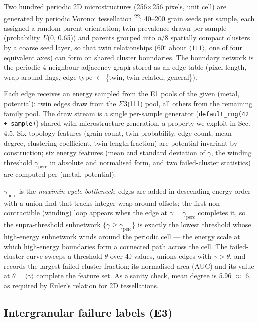 \documentclass[11pt]{article}
\begin{document}
Two hundred periodic 2D microstructures (256$\times$256 pixels, unit cell) are generated by periodic Voronoi tessellation \textsuperscript{22}: 40--200 grain seeds per sample, each assigned a random parent orientation; twin prevalence drawn per sample (probability \textit{U}(0, 0.65)) and parents grouped into \textit{n}/8 spatially compact clusters by a coarse seed layer, so that twin relationships (60$^\circ$ about $\langle 111\rangle$, one of four equivalent axes) can form on shared cluster boundaries. The boundary network is the periodic 4-neighbour adjacency graph stored as an edge table (pixel length, wrap-around flags, edge type $\in$ \{twin, twin-related, general\}).

Each edge receives an energy sampled from the E1 pools of the given (metal, potential): twin edges draw from the $\Sigma$3(111) pool, all others from the remaining family pool. The draw stream is a single per-sample generator (\texttt{default\_rng(42 + sample)}) shared with microstructure generation, a property we exploit in Sec. 4.5. Six topology features (grain count, twin probability, edge count, mean degree, clustering coefficient, twin-length fraction) are potential-invariant by construction; six energy features (mean and standard deviation of $\gamma$, the winding threshold $\gamma_{\mathrm{perc}}$ in absolute and normalised form, and two failed-cluster statistics) are computed per (metal, potential).

$\gamma_{\mathrm{perc}}$ is the \textit{maximin cycle bottleneck}: edges are added in descending energy order with a union-find that tracks integer wrap-around offsets; the first non-contractible (winding) loop appears when the edge at $\gamma = \gamma_{\mathrm{perc}}$ completes it, so the supra-threshold subnetwork $\{\gamma \ge \gamma_{\mathrm{perc}}\}$ is exactly the lowest threshold whose high-energy subnetwork winds around the periodic cell --- the energy scale at which high-energy boundaries form a connected path across the cell. The failed-cluster curve sweeps a threshold $\theta$ over 40 values, unions edges with $\gamma > \theta$, and records the largest failed-cluster fraction; its normalised area (AUC) and its value at $\theta = \langle\gamma\rangle$ complete the feature set. As a sanity check, mean degree is 5.96 $\approx$ 6, as required by Euler's relation for 2D tessellations.

\subsection{Intergranular failure labels (E3)}
\end{document}
